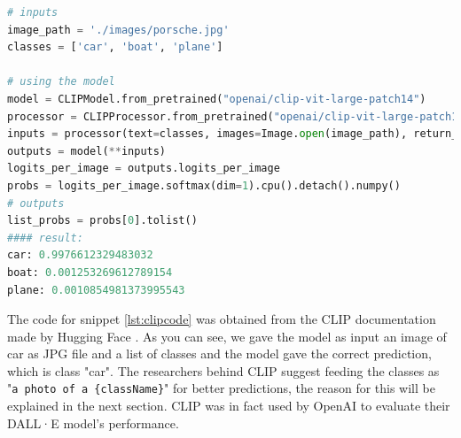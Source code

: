 \documentclass[a4paper,11pt,oneside]{article}
\begin{document}
  \begin{lstlisting}[language=Python, caption={Using CLIP model},label={lst:clipcode}, mathescape=true, breaklines=true]
# inputs
image_path = './images/porsche.jpg'
classes = ['car', 'boat', 'plane']
  	
# using the model
model = CLIPModel.from_pretrained("openai/clip-vit-large-patch14")
processor = CLIPProcessor.from_pretrained("openai/clip-vit-large-patch14")
inputs = processor(text=classes, images=Image.open(image_path), return_tensors="pt", padding=True)
outputs = model(**inputs)
logits_per_image = outputs.logits_per_image 
probs = logits_per_image.softmax(dim=1).cpu().detach().numpy() 
# outputs
list_probs = probs[0].tolist()
#### result:
car: 0.9976612329483032
boat: 0.001253269612789154
plane: 0.0010854981373995543
  \end{lstlisting}
  
  The code for snippet \ref{lst:clipcode} was obtained from the CLIP documentation made by Hugging Face \cite{huggingfaceCLIP}. As you can see, we gave the model as input an image of car as JPG file and a list of classes and the model gave the correct prediction, which is class "car". The researchers behind CLIP suggest feeding the classes as "\texttt{a photo of a \{className\}}" for better predictions, the reason for this will be explained in the next section. CLIP was in fact used by OpenAI to evaluate their DALL·E \cite{dall-e} model's performance.
\end{document}
